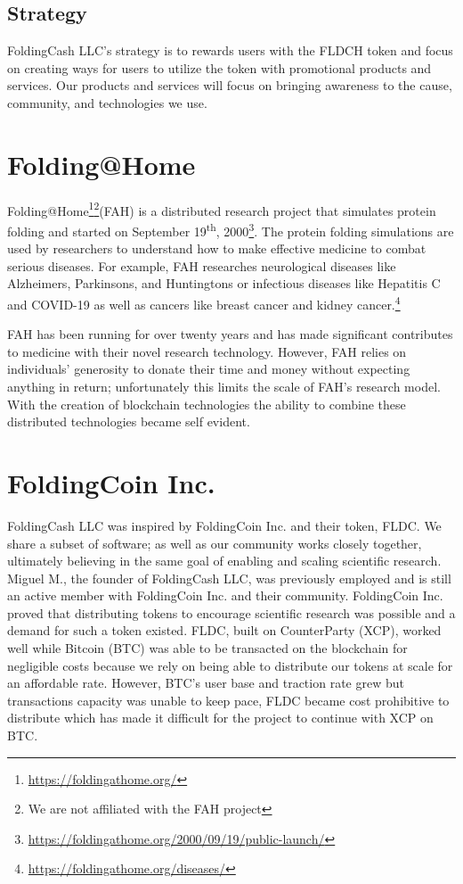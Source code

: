 \documentclass[letterpaper,12pt,titlepage]{article}
\def\org{FoldingCash LLC}
\def\ticker{FLDCH}
\def\fahWebsite{\url{https://foldingathome.org/}}
\def\fahLaunchDate{September 19\textsuperscript{th}, 2000}
\def\fahLaunchReference{\url{https://foldingathome.org/2000/09/19/public-launch/}}
\def\fahDiseasesReference{\url{https://foldingathome.org/diseases/}}
\begin{document}
\subsection{Strategy}
\org{'s} strategy is to rewards users with the \ticker{} token and focus on creating ways for users to utilize the token with promotional products and services. Our products and services will focus on bringing awareness to the cause, community, and technologies we use.

\section{Folding@Home}
Folding@Home\footnote{\fahWebsite}\footnote{We are not affiliated with the FAH project}(FAH) is a distributed research project that simulates protein folding and started on \fahLaunchDate\footnote{\fahLaunchReference}. The protein folding simulations are used by researchers to understand how to make effective medicine to combat serious diseases. For example, FAH researches neurological diseases like Alzheimers, Parkinsons, and Huntingtons or infectious diseases like Hepatitis C and COVID-19 as well as cancers like breast cancer and kidney cancer.\footnote{\fahDiseasesReference}

FAH has been running for over twenty years and has made significant contributes to medicine with their novel research technology. However, FAH relies on individuals' generosity to donate their time and money without expecting anything in return; unfortunately this limits the scale of FAH's research model. With the creation of blockchain technologies the ability to combine these distributed technologies became self evident.

\section{FoldingCoin Inc.}
\org{} was inspired by FoldingCoin Inc. and their token, FLDC. We share a subset of software; as well as our community works closely together, ultimately believing in the same goal of enabling and scaling scientific research. Miguel M., the founder of \org{}, was previously employed and is still an active member with FoldingCoin Inc. and their community. FoldingCoin Inc. proved that distributing tokens to encourage scientific research was possible and a demand for such a token existed. FLDC, built on CounterParty (XCP), worked well while Bitcoin (BTC) was able to be transacted on the blockchain for negligible costs because we rely on being able to distribute our tokens at scale for an affordable rate. However, BTC's user base and traction rate grew but transactions capacity was unable to keep pace, FLDC became cost prohibitive to distribute which has made it difficult for the project to continue with XCP on BTC.
\end{document}
